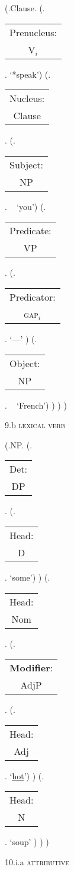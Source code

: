 \documentclass[12pt,letterpaper]{article}
\begin{document}
\begin{figure}
	\begin{center}
		\begin{parsetree}
			(.Clause.
			(.\begin{tabular}{c}Prenucleus:\\V$_i$\end{tabular}. `*speak')
			(.\begin{tabular}{c}Nucleus:\\Clause\end{tabular}.
			(.\begin{tabular}{c}Subject:\\NP\end{tabular}. ~ `you')
			(.\begin{tabular}{c}Predicate:\\VP\end{tabular}.
			(.\begin{tabular}{c}Predicator:\\\textsc{gap}$_i$\end{tabular}. `---' )
			(.\begin{tabular}{c}Object:\\NP\end{tabular}. ~ `French')
			)
			)
			)
			
			\hfill \break\hfill \break
		\end{parsetree}
		9.b \textsc{lexical verb}
	\end{center}
\end{figure}

\begin{figure}
	\begin{center}
		\begin{parsetree}
			(.NP.
			(.\begin{tabular}{c}Det:\\DP\end{tabular}. 
			(.\begin{tabular}{c}Head:\\D\end{tabular}.  `some')
			)
			(.\begin{tabular}{c}Head:\\Nom\end{tabular}. 
			(.\begin{tabular}{c}\textbf{Modifier}:\\AdjP\end{tabular}. 
			(.\begin{tabular}{c}Head:\\Adj\end{tabular}.  `\underline{hot}')
			)
			(.\begin{tabular}{c}Head:\\N\end{tabular}.  `soup' )
			)
			)
			
			\hfill \break\hfill \break
		\end{parsetree}
		10.i.a \textsc{attributive}
	\end{center}
\end{figure}
\end{document}
